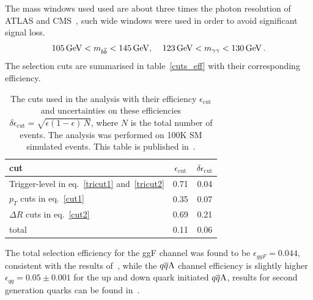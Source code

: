 The mass windows used used are about three times the photon resolution of ATLAS and CMS~\cite{ATL-PHYS-PUB-2013-009,CMS:2013aoa}, such wide windows were used in order to avoid significant signal loss.
\begin{equation}
	105\,\GeV < m_{b \bar b} < 145 \, \GeV, \; \; \; \;123\, \GeV < m_{\gamma \gamma} < 130 \, \GeV\,.
	\label{cut3}
\end{equation}
The selection cuts are summarised in table~\autoref{cuts_eff} with their corresponding efficiency. 
\begin{table}[!t]
	\centering
	\begin{tabular}{l cc }
			\toprule
			cut  & $\epsilon_{\mathrm{cut}}$  &  $ \delta \epsilon_{\mathrm{cut}}$ \\
			\midrule
			Trigger-level in eq.~\eqref{tricut1} and~\eqref{tricut2} &0.71 & 0.04 \\
			$p_T$ cuts in eq.~\eqref{cut1} & 0.35 & 0.07\\
			$\Delta R$ cuts  in eq.~\eqref{cut2} & 0.69 & 0.21 \\
			\hline
			total    & 0.11 & 0.06 \\
			\bottomrule
		\end{tabular}
	\caption{The cuts used in the analysis with their efficiency $\epsilon_{\mathrm{cut}}$ and uncertainties on these efficiencies $ \delta \epsilon_{\mathrm{cut}} = \sqrt{\epsilon(1-\epsilon)\,N}$, where $N$ is the total number of events. The analysis was performed on 100K SM simulated events. This table is published in~\cite{Alasfar:2019pmn}.}
	\label{cuts_eff}
\end{table}
%
The total selection efficiency for the ggF channel was found to be $\epsilon_{ggF} = 0.044$, consistent with the results of~\cite{Azatov:2015oxa}, while the $q\overline q \rm A$ channel efficiency is slightly higher $\epsilon_{qq} = 0.05 \pm 0.001$ for the up and down quark initiated $ q\overline q \rm A$, results for second generation quarks can be found in~\cite{Alasfar:2019pmn}.
